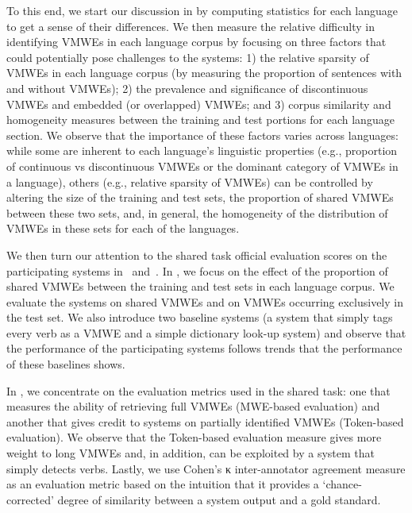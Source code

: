 \documentclass[output=paper,modfonts,nonflat,draftmode]{langsci/langscibook}
\begin{document}
To this end, we start our discussion in  by computing statistics for each language to get a sense of their differences. We then measure the relative difficulty in identifying VMWEs in each language corpus by focusing on three factors that could potentially pose challenges to the systems: 1) the relative sparsity of VMWEs in each language corpus (by measuring the proportion of sentences with and without VMWEs); 2) the prevalence and significance of discontinuous VMWEs and embedded (or overlapped) VMWEs; and 3) corpus similarity and homogeneity measures between the training and test portions for each language section. We observe that the importance of these factors varies across languages: while some are inherent to each language's linguistic properties (e.g., proportion of continuous vs discontinuous VMWEs or the dominant category of VMWEs in a language), others (e.g., relative sparsity of VMWEs) can be controlled by altering the size of the training and test sets, the proportion of shared VMWEs between these two sets, and, in general, the homogeneity of the distribution of VMWEs in these sets for each of the languages.  

We then turn our attention to the shared task official evaluation scores on the participating systems in ~and~. In , we focus on the effect of the proportion of shared VMWEs between the training and test sets in each language corpus. We evaluate the systems on shared VMWEs and on VMWEs occurring exclusively in the test set. We also introduce two baseline systems (a system that simply tags every verb as a VMWE and a simple dictionary look-up system) and observe that the performance of the participating systems follows trends that the performance of these baselines shows. 

In , we concentrate on the evaluation metrics used in the shared task: one that measures the ability of retrieving full VMWEs (MWE-based evaluation) and another that gives credit to systems on partially identified VMWEs (Token-based evaluation). We observe that the Token-based evaluation measure gives more weight to long VMWEs and, in addition, can be exploited by a system that simply detects verbs. Lastly, we use Cohen's κ inter-annotator agreement measure as an evaluation metric based on the intuition that it provides a `chance-corrected' degree of similarity between a system output and a gold standard. 
\end{document}
